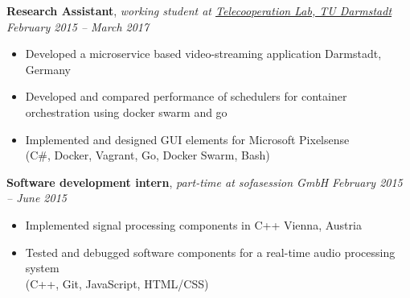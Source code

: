 \documentclass[9pt]{extarticle}
\begin{document}
\noindent
{\bf Research Assistant}, \textit{working student at \href{https://www.informatik.tu-darmstadt.de/telekooperation/telecooperation_group/index.en.jsp}{Telecooperation Lab, TU Darmstadt}}  \hfill \textit{February 2015 -- March 2017}
\begin{itemize}
\setlength\itemsep{0.05em}
    \item Developed a microservice based video-streaming application \hfill Darmstadt, Germany
    \item Developed and compared performance of schedulers for container orchestration using docker swarm and go
    \item Implemented and designed GUI elements for Microsoft Pixelsense \\
    (C\#, Docker, Vagrant, Go, Docker Swarm, Bash) \\
\end{itemize}


\noindent
{\bf Software development intern}, \textit{part-time at sofasession GmbH}  \hfill \textit{February 2015 -- June 2015}
\begin{itemize}
    \setlength\itemsep{0.05em}
    \item Implemented signal processing components in C++ \hfill Vienna, Austria
    \item Tested and debugged software components for a real-time audio processing system \\
    (C++, Git, JavaScript, HTML/CSS) \\
\end{itemize}
\end{document}
